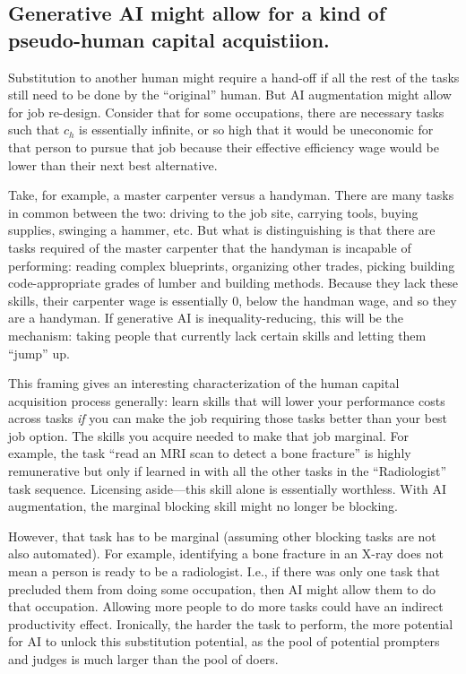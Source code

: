 \documentclass{article}
\theoremstyle{plain}
\theoremstyle{plain}
\begin{document}
\subsection{Generative AI might allow for a kind of pseudo-human capital acquistiion.}
Substitution to another human might require a hand-off if all the rest of the tasks still need to be done by the ``original'' human. 
But AI augmentation might allow for job re-design. 
Consider that for some occupations, there are necessary tasks such that $c_h$ is essentially infinite, or so high that it would be uneconomic for that person to pursue that job because their effective efficiency wage would be lower than their next best alternative.  

Take, for example, a master carpenter versus a handyman.
There are many tasks in common between the two: driving to the job site, carrying tools, buying supplies, swinging a hammer, etc.
But what is distinguishing is that there are tasks required of the master carpenter that the handyman is incapable of performing: 
reading complex blueprints, organizing other trades, picking building code-appropriate grades of lumber and building methods.
Because they lack these skills, their carpenter wage is essentially 0, below the handman wage, and so they are a handyman.
If generative AI is inequality-reducing, this will be the mechanism: taking people that currently lack certain skills and letting them ``jump'' up. 

This framing gives an interesting characterization of the human capital acquisition process generally: 
learn skills that will lower your performance costs across tasks \emph{if} you can make the job requiring those tasks better than your best job option.
The skills you acquire needed to make that job marginal. 
For example, the task ``read an MRI scan to detect a bone fracture'' is highly remunerative but only if learned in with all the other tasks in the ``Radiologist'' task sequence.
Licensing aside---this skill alone is essentially worthless.  
With AI augmentation, the marginal blocking skill might no longer be blocking. 

However, that task has to be marginal (assuming other blocking tasks are not also automated). 
For example, identifying a bone fracture in an X-ray does not mean a person is ready to be a radiologist.
I.e., if there was only one task that precluded them from doing some occupation, then AI might allow them to do that occupation.
Allowing more people to do more tasks could have an indirect productivity effect. 
Ironically, the harder the task to perform, the more potential for AI to unlock this substitution potential, as the pool of potential prompters and judges is much larger than the pool of doers.
\end{document}
